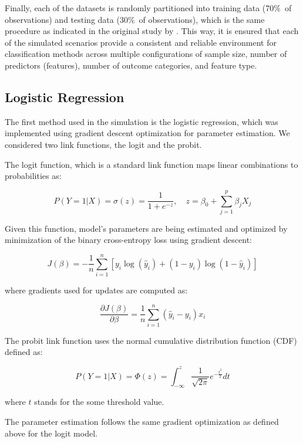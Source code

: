 \documentclass[12pt]{article}
\begin{document}
Finally, each of the datasets is randomly partitioned into training data (70\%\ of observations) and testing data (30\%\ of observations), which is the same procedure as indicated in the original study by \cite{kim:10}. This way, it is ensured that each of the simulated scenarios provide a consistent and reliable environment for classification methods across multiple configurations of sample size, number of predictors (features), number of outcome categories, and feature type.

\subsection{Logistic Regression}

The first method used in the simulation is the logistic regression, which was implemented using gradient descent optimization for parameter estimation. We considered two link functions, the logit and the probit.

The logit function, which is a standard link function maps linear combinations to probabilities as:

\begin{equation}
P(Y=1|X) = \sigma(z) = \frac{1}{1+e^{-z}}, \quad z = \beta_0 + \sum_{j=1}^{p}\beta_j X_j
\end{equation}

Given this function, model's parameters are being estimated and optimized by minimization of the binary cross-entropy loss using gradient descent:

\begin{equation}
J(\beta) = -\frac{1}{n}\sum_{i=1}^{n}[y_i\log(\hat{y}_i) + (1 - y_i)\log(1-\hat{y}_i)]
\end{equation}

where gradients used for updates are computed as:

\[
\frac{\partial J(\beta)}{\partial \beta} = \frac{1}{n}\sum_{i=1}^{n}(\hat{y}_i-y_i)x_{i}
\]

The probit link function uses the normal cumulative distribution function (CDF) defined as:

\begin{equation}
P(Y=1|X) = \Phi(z) = \int_{-\infty}^{z}\frac{1}{\sqrt{2\pi}}e^{-\frac{t^2}{2}} dt
\end{equation}

where $t$ stands for the some threshold value.

The parameter estimation follows the same gradient optimization as defined above for the logit model.
\end{document}
